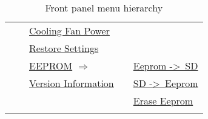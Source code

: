 {\begin{table}[!hb]
\begin{tabular}{lllll}
\hhline{~~|-|~~}
&& \cellcolor{LightBlue} \hyperref[sec:cfanpower]{Cooling Fan Power} \\
\hhline{~~|-|~~}
&& \cellcolor{LightCyan} \hyperref[sec:restore-settings]{Restore Settings} \\
\hhline{~~|-|~|-|}
&&  \multicolumn{2}{l}{\cellcolor{LightBlue} \hyperref[sec:eeprom]{EEPROM} \hfil\phantom{nmmmmmm} \hfil $\Longrightarrow$} & \cellcolor{LightBlue} \hyperref[sec:eeprom]{Eeprom -\textgreater\ SD} \\
\hhline{~~|-|~|-|}
&& \cellcolor{LightCyan} \hyperref[sec:versinf]{Version Information} && \cellcolor{LightBlue} \hyperref[sec:eeprom]{SD -\textgreater\ Eeprom} \\
\hhline{~~|-|~|-|}
&&&& \cellcolor{LightBlue} \hyperref[sec:eeprom]{Erase Eeprom} \\
\hhline{~~~~|-|}
\end{tabular}
\caption[Front panel menu hierarchy]{Front panel menu hierarchy}
\label{tab:menu-tree}
\end{table}
}
\fi
\fi
